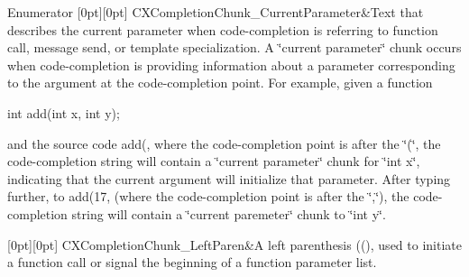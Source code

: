 \begin{DoxyEnumFields}{Enumerator}
[0pt][0pt]{}\mbox{\label{group__CINDEX__CODE__COMPLET_gga82570056548565efdd6fc74e57e75bbda31d545388d02dc574994aabdfbb15d72}} 
C\+X\+Completion\+Chunk\+\_\+\+Current\+Parameter&Text that describes the current parameter when code-\/completion is referring to function call, message send, or template specialization. A \char`\"{}current parameter\char`\"{} chunk occurs when code-\/completion is providing information about a parameter corresponding to the argument at the code-\/completion point. For example, given a function


\begin{DoxyCode}
int add(int x, int y);
\end{DoxyCode}


and the source code {\ttfamily add}(, where the code-\/completion point is after the \char`\"{}(\char`\"{}, the code-\/completion string will contain a \char`\"{}current parameter\char`\"{} chunk for \char`\"{}int x\char`\"{}, indicating that the current argument will initialize that parameter. After typing further, to {\ttfamily add}(17, (where the code-\/completion point is after the \char`\"{},\char`\"{}), the code-\/completion string will contain a \char`\"{}current paremeter\char`\"{} chunk to \char`\"{}int y\char`\"{}. \\
\hline

[0pt][0pt]{}\mbox{\label{group__CINDEX__CODE__COMPLET_gga82570056548565efdd6fc74e57e75bbda604e72a5e3aa7e39a72408dde3be9458}} 
C\+X\+Completion\+Chunk\+\_\+\+Left\+Paren&A left parenthesis (\textquotesingle{}(\textquotesingle{}), used to initiate a function call or signal the beginning of a function parameter list. \\
\hline


\end{DoxyEnumFields}
